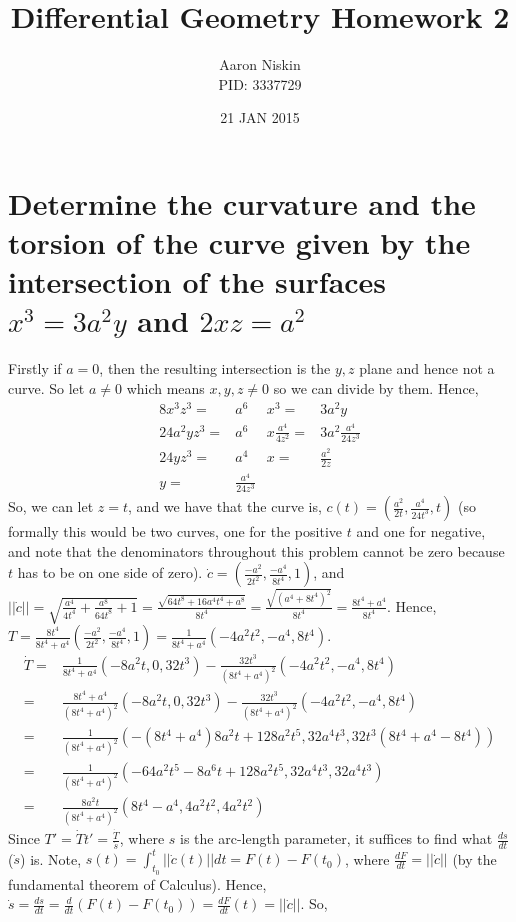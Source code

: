 \documentclass[12pt]{amsart}
\begin{document}
\title{Differential Geometry Homework 2}
\author{Aaron Niskin \\PID: 3337729}
\date{21 JAN 2015}
\maketitle

\section{Determine the curvature and the torsion of the curve given by the intersection of the surfaces $x^3=3a^2y$ and $2xz=a^2$}
Firstly if $a=0$, then the resulting intersection is the $y,z$ plane and hence not a curve. So let $a\neq0$ which means $x,y,z\neq0$ so we can divide by them. Hence,
\begin{align*}
	8x^3z^3=&a^6 & x^3=&3a^2y
	\\24a^2yz^3=&a^6 & x\frac{a^4}{4z^2}=&3a^2\frac{a^4}{24z^3}
	\\24yz^3=&a^4 & x=&\frac{a^2}{2z}
	\\y=&\frac{a^4}{24z^3} & &
\end{align*}
So, we can let $z=t$, and we have that the curve is, $c(t)=\left(\frac{a^2}{2t},\frac{a^4}{24t^3},t\right)$ (so formally this would be two curves, one for the positive $t$ and one for negative, and note that the denominators throughout this problem cannot be zero because $t$ has to be on one side of zero). $\dot c=\left(\frac{-a^2}{2t^2},\frac{-a^4}{8t^4},1\right)$, and $||\dot c||=\sqrt{\frac{a^4}{4t^4}+\frac{a^8}{64t^8}+1}=\frac{\sqrt{64t^8+16a^4t^4+a^8}}{8t^4}=\frac{\sqrt{(a^4+8t^4)^2}}{8t^4}=\frac{8t^4+a^4}{8t^4}$. Hence, $T=\frac{8t^4}{8t^4+a^4}\left(\frac{-a^2}{2t^2},\frac{-a^4}{8t^4},1\right)=\frac{1}{8t^4+a^4}\left(-4a^2t^2,-a^4,8t^4\right)$.
\begin{align*}
	\dot T=&\frac{1}{8t^4+a^4}\left(-8a^2t,0,32t^3\right)-\frac{32t^3}{(8t^4+a^4)^2}\left(-4a^2t^2,-a^4,8t^4\right)
	\\=&\frac{8t^4+a^4}{(8t^4+a^4)^2}\left(-8a^2t,0,32t^3\right)-\frac{32t^3}{(8t^4+a^4)^2}\left(-4a^2t^2,-a^4,8t^4\right)
	\\=&\frac{1}{(8t^4+a^4)^2}\left(-(8t^4+a^4)8a^2t+128a^2t^5,32a^4t^3,32t^3(8t^4+a^4-8t^4)\right)
	\\=&\frac{1}{(8t^4+a^4)^2}\left(-64a^2t^5-8a^6t+128a^2t^5,32a^4t^3,32a^4t^3\right)
	\\=&\frac{8a^2t}{(8t^4+a^4)^2}\left(8t^4-a^4,4a^2t^2,4a^2t^2\right)
\end{align*}
Since $T'=\dot Tt'=\frac{\dot T}{\dot s}$, where $s$ is the arc-length parameter, it suffices to find what $\frac{ds}{dt}$ ($\dot s$) is. Note, $s(t)=\int_{t_0}^t||\dot c(t)||dt=F(t)-F(t_0)$, where $\frac{dF}{dt}=||\dot c||$ (by the fundamental theorem of Calculus). Hence, $\dot s=\frac{ds}{dt}=\frac{d}{dt}(F(t)-F(t_0))=\frac{dF}{dt}(t)=||\dot c||$. So, 
\end{document}
